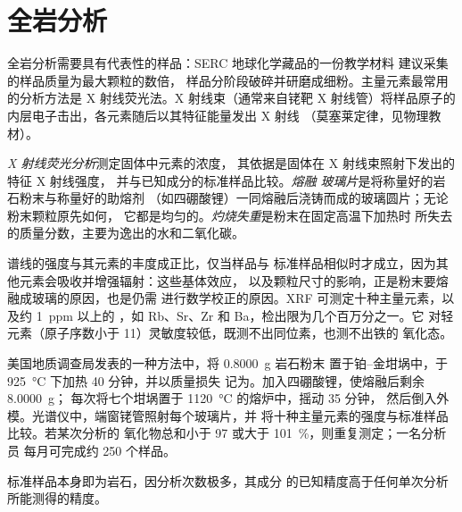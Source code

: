 \section{全岩分析}\label{sec:b2:field-lab-methods-2:whole-rock}

全岩分析需要具有代表性的样品：SERC 地球化学藏品的一份教学材料
建议采集的样品质量为最大颗粒的数倍，
样品分阶段破碎并研磨成细粉。主量元素最常用的分析方法是
X 射线荧光法。X 射线束（通常来自铑靶 X 射线管）将样品原子的
内层电子击出，各元素随后以其特征能量发出 X 射线
（莫塞莱定律，见物理教材）。

\begin{definition}\label{def:b2:field-lab-methods-2:xrf}
\emph{X 射线荧光分析}测定固体中元素的浓度，
其依据是固体在 X 射线束照射下发出的特征 X 射线强度，
并与已知成分的标准样品比较。\emph{熔融
玻璃片}是将称量好的岩石粉末与称量好的助熔剂
（如四硼酸锂）一同熔融后浇铸而成的玻璃圆片；无论粉末颗粒原先如何，
它都是均匀的。\emph{灼烧失重}是粉末在固定高温下加热时
所失去的质量分数，主要为逸出的水和二氧化碳。
\end{definition}

谱线的强度与其元素的丰度成正比，仅当样品与
标准样品相似时才成立，因为其他元素会吸收并增强辐射：这些基体效应，
以及颗粒尺寸的影响，正是粉末要熔融成玻璃的原因，也是仍需
进行数学校正的原因。XRF 可测定十种主量元素，以及约 \qty{1}{ppm} 以上的
，如 Rb、Sr、Zr 和 Ba，检出限为几个百万分之一。它
对轻元素（原子序数小于 11）灵敏度较低，既测不出同位素，也测不出铁的
氧化态。

\begin{inthelab}[一批熔融玻璃片]
美国地质调查局发表的一种方法中，将 \qty{0.8000}{g} 岩石粉末
置于铂–金坩埚中，于 \qty{925}{\celsius} 下加热 40 分钟，并以质量损失
记为。加入四硼酸锂，使熔融后剩余 \qty{8.0000}{g}；
每次将七个坩埚置于 \qty{1120}{\celsius} 的熔炉中，摇动 35 分钟，
然后倒入外模。光谱仪中，端窗铑管照射每个玻璃片，并
将十种主量元素的强度与标准样品比较。若某次分析的
氧化物总和小于 97 或大于 \qty{101}{\percent}，则重复测定；一名分析员
每月可完成约 250 个样品。
\end{inthelab}

标准样品本身即为岩石，因分析次数极多，其成分
的已知精度高于任何单次分析所能测得的精度。

